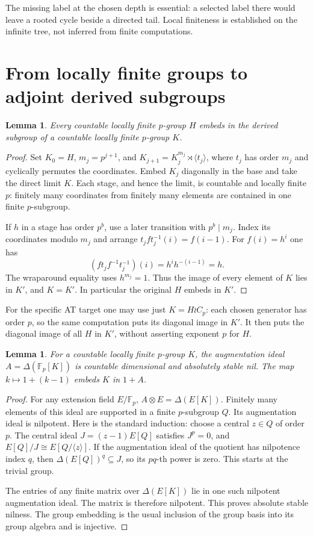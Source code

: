 \documentclass[11pt]{article}
\newtheorem{lemma}[theorem]{Lemma}
\theoremstyle{definition}
\newcommand{\Fp}{\mathbb F_p}
\newcommand{\Aug}{\Delta}
\begin{document}
The missing label at the chosen depth is essential: a selected label
there would leave a rooted cycle beside a directed tail. Local finiteness
is established on the infinite tree, not inferred from finite computations.

\section{From locally finite groups to adjoint derived subgroups}

\begin{lemma}\label{lem:envelope}
Every countable locally finite \(p\)-group \(H\) embeds in the derived
subgroup of a countable locally finite \(p\)-group \(K\).
\end{lemma}
\begin{proof}
Set \(K_0=H\), \(m_j=p^{j+1}\), and
\(K_{j+1}=K_j^{m_j}\rtimes\langle t_j\rangle\), where \(t_j\) has order
\(m_j\) and cyclically permutes the coordinates. Embed \(K_j\) diagonally
in the base and take the direct limit \(K\). Each stage, and hence the
limit, is countable and locally finite \(p\): finitely many coordinates
from finitely many elements are contained in one finite \(p\)-subgroup.

If \(h\) in a stage has order \(p^b\), use a later transition with
\(p^b\mid m_j\). Index its coordinates modulo \(m_j\) and arrange
\(t_j f t_j^{-1}(i)=f(i-1)\). For \(f(i)=h^i\) one has
\[
 (f t_j f^{-1}t_j^{-1})(i)=h^i h^{-(i-1)}=h.
\]
The wraparound equality uses \(h^{m_j}=1\).
Thus the image of every element of \(K\) lies in \(K'\), and \(K=K'\).
In particular the original \(H\) embeds in \(K'\).
\end{proof}

For the specific AT target one may use just \(K=H\wr C_p\):
each chosen generator has order \(p\), so the same computation puts its
diagonal image in \(K'\). It then puts the diagonal image of all \(H\)
in \(K'\), without asserting exponent \(p\) for \(H\).

\begin{lemma}\label{lem:augmentation}
For a countable locally finite \(p\)-group \(K\), the augmentation ideal
\(A=\Aug(\Fp[K])\) is countable dimensional and absolutely stable nil.
The map \(k\mapsto1+(k-1)\) embeds \(K\) in \(1+A\).
\end{lemma}
\begin{proof}
For any extension field \(E/\Fp\),
\(A\otimes E=\Aug(E[K])\). Finitely many elements of this ideal are
supported in a finite \(p\)-subgroup \(Q\).
Its augmentation ideal is nilpotent. Here is the standard induction:
choose a central \(z\in Q\) of order \(p\). The central ideal
\(J=(z-1)E[Q]\) satisfies \(J^p=0\), and
\(E[Q]/J\cong E[Q/\langle z\rangle]\).
If the augmentation ideal of the quotient has nilpotence index \(q\),
then \(\Aug(E[Q])^q\subseteq J\), so its \(pq\)-th power is zero.
This starts at the trivial group.

The entries of any finite matrix over \(\Aug(E[K])\) lie in one such
nilpotent augmentation ideal. The matrix is therefore nilpotent.
This proves absolute stable nilness. The group embedding is the usual
inclusion of the group basis into its group algebra and is injective.
\end{proof}
\end{document}
